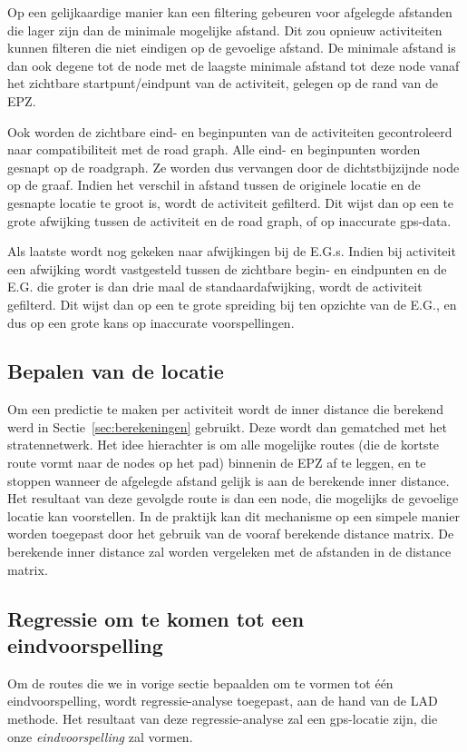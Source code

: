 Op een gelijkaardige manier kan een filtering gebeuren voor afgelegde afstanden
die lager zijn dan de minimale mogelijke afstand. Dit zou opnieuw activiteiten
kunnen filteren die niet eindigen op de gevoelige afstand. De minimale afstand
is dan ook degene tot de node met de laagste minimale afstand tot deze node
vanaf het zichtbare startpunt/eindpunt van de activiteit, gelegen op de rand
van de \ac{EPZ}.

Ook worden de zichtbare eind- en beginpunten van de activiteiten gecontroleerd
naar compatibiliteit met de road graph. Alle eind- en beginpunten worden
gesnapt op de roadgraph. Ze worden dus vervangen door de dichtstbijzijnde node
op de graaf. Indien het verschil in afstand tussen de originele locatie en de
gesnapte locatie te groot is, wordt de activiteit gefilterd. Dit wijst dan op
een te grote afwijking tussen de activiteit en de road graph, of op inaccurate
gps-data.

Als laatste wordt nog gekeken naar afwijkingen bij de \acp{E.G.}. Indien bij
activiteit een afwijking wordt vastgesteld tussen de zichtbare begin- en
eindpunten en de \ac{E.G.} die groter is dan drie maal de standaardafwijking,
wordt de activiteit gefilterd. Dit wijst dan op een te grote spreiding bij ten
opzichte van de \ac{E.G.}, en dus op een grote kans op inaccurate
voorspellingen.

\subsection{Bepalen van de locatie}
Om een predictie te maken per activiteit wordt de inner distance die berekend
werd in Sectie~\ref{sec:berekeningen} gebruikt. Deze wordt dan gematched met
het stratennetwerk. Het idee hierachter is om alle mogelijke routes (die de
kortste route vormt naar de nodes op het pad) binnenin de \ac{EPZ} af te
leggen, en te stoppen wanneer de afgelegde afstand gelijk is aan de berekende
inner distance. Het resultaat van deze gevolgde route is dan een node, die
mogelijks de gevoelige locatie kan voorstellen. In de praktijk kan dit
mechanisme op een simpele manier worden toegepast door het gebruik van de
vooraf berekende distance matrix. De berekende inner distance zal worden
vergeleken met de afstanden in de distance matrix.

\subsection{Regressie om te komen tot een eindvoorspelling}
Om de routes die we in vorige sectie bepaalden om te vormen tot één
eindvoorspelling, wordt regressie-analyse toegepast, aan de hand van de
\ac{LAD} methode. Het resultaat van deze regressie-analyse zal een
\ac{gps}-locatie zijn, die onze \textit{eindvoorspelling} zal vormen.

